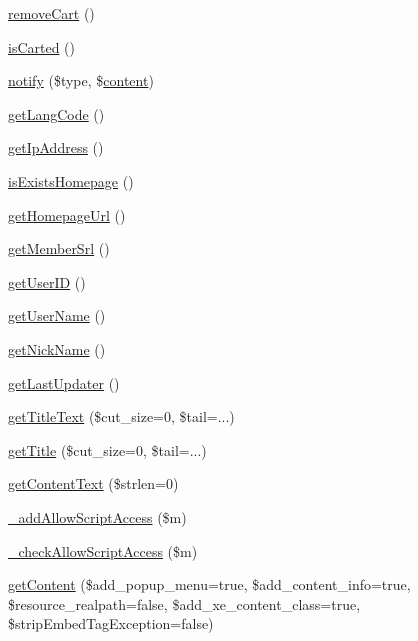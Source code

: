 \begin{DoxyCompactItemize}
\item 
\hyperlink{classdocumentItem_aa66932772c39aeff91238badd8246969}{remove\+Cart} ()
\item 
\hyperlink{classdocumentItem_a505c87502da3ca4b656230125ffa4f1e}{is\+Carted} ()
\item 
\hyperlink{classdocumentItem_afbccc4d35ce638fac62221e5602cc750}{notify} (\$type, \$\hyperlink{classcontent}{content})
\item 
\hyperlink{classdocumentItem_a7491640a855ace286820cb11f273ddb6}{get\+Lang\+Code} ()
\item 
\hyperlink{classdocumentItem_ac0e9b0006f067bc0918751148606d325}{get\+Ip\+Address} ()
\item 
\hyperlink{classdocumentItem_a7cc882ce0da6cbe675be8fdb980a0d97}{is\+Exists\+Homepage} ()
\item 
\hyperlink{classdocumentItem_ab9117599bb123e83289d2a24fd44bf50}{get\+Homepage\+Url} ()
\item 
\hyperlink{classdocumentItem_a75af5f05bd55c32bdc6c17dd8511e4e8}{get\+Member\+Srl} ()
\item 
\hyperlink{classdocumentItem_a66a8157a3cc7c82325eadcefe6390a58}{get\+User\+I\+D} ()
\item 
\hyperlink{classdocumentItem_a072696b683278c84bc3ebfee46d4216f}{get\+User\+Name} ()
\item 
\hyperlink{classdocumentItem_ab91ca9e1defb1a570212baa4f380706a}{get\+Nick\+Name} ()
\item 
\hyperlink{classdocumentItem_a784effc9e694d82da32e06e95482ff28}{get\+Last\+Updater} ()
\item 
\hyperlink{classdocumentItem_aad953dc30cf01a1d451cb90c66c09b0c}{get\+Title\+Text} (\$cut\+\_\+size=0, \$tail=\textquotesingle{}...\textquotesingle{})
\item 
\hyperlink{classdocumentItem_a365509266cc36e56b66df824bc2fcbfc}{get\+Title} (\$cut\+\_\+size=0, \$tail=\textquotesingle{}...\textquotesingle{})
\item 
\hyperlink{classdocumentItem_acdef9404e1dc50d82456fb112212e23e}{get\+Content\+Text} (\$strlen=0)
\item 
\hyperlink{classdocumentItem_a6bc6bbe65e83e9bfc03bae1fea5b75d7}{\+\_\+add\+Allow\+Script\+Access} (\$m)
\item 
\hyperlink{classdocumentItem_a0d88d945333c887802ad1f8442f5d5c7}{\+\_\+check\+Allow\+Script\+Access} (\$m)
\item 
\hyperlink{classdocumentItem_ab93870c122bc952a206f3c64ced3aa9e}{get\+Content} (\$add\+\_\+popup\+\_\+menu=true, \$add\+\_\+content\+\_\+info=true, \$resource\+\_\+realpath=false, \$add\+\_\+xe\+\_\+content\+\_\+class=true, \$strip\+Embed\+Tag\+Exception=false)

\end{DoxyCompactItemize}
